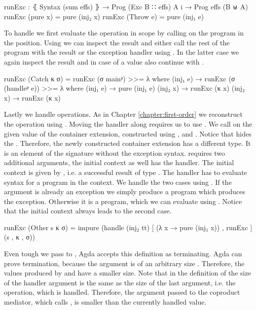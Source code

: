 \begin{code}
runExc : ⦃ Syntax (sum effs) ⦄ → Prog (Exc B ∷ effs) A {i} → Prog effs (B ⊎ A)
runExc (pure x)     = pure (inj₂ x)
runExc (Throw e)    = pure (inj₁ e)
\end{code}
To handle  we first evaluate the operation in
scope by calling  on the program in the
 position.
Using \AgdaFunction{>>=} we can inspect the result and either call the rest of
the program  with the result or the exception handler using
.
In the latter case we again inspect the result and in case of a value also
continue with .
\begin{code}
runExc (Catch κ σ)  = runExc (σ mainᵖ) >>= λ where
  (inj₁ e) → runExc (σ (handleᵖ e)) >>= λ where
    (inj₁ e) → pure (inj₁ e)
    (inj₂ x) → runExc (κ x)
  (inj₂ x) → runExc (κ x)
\end{code}
Lastly we handle  operations.
As in Chapter \ref{chapter:first-order} we reconstruct the operation using
.
Moving the handler along requires us to use .
We call  on the given value of the container extension,
constructed using ,  and .
Notice that  hides the
.
Therefore, the newly constructed container extension has a different type.
It is an element of the signature without the exception syntax.
 requires two additional arguments, the initial context as
well has the handler.
The initial context is given by
\AgdaSpace{}, i.e. a
successful result of type .
The handler has to evaluate  syntax for a program in the
context.
We handle the two cases using \AgdaFunction{[\_,\_]}.
If the argument is already an exception we simply produce a
 program which produces the exception.
Otherwise it is a program, which we can evaluate using .
Notice that the initial context always leads to the second case.
\begin{code}
runExc (Other s κ σ) = impure (handle (inj₂ tt) [ (λ x → pure (inj₁ x)) , runExc ] (s , κ , σ))
\end{code}
Even tough we pass  to , Agda accepts this
definition as terminating.
Agda can prove termination, because the argument is of an arbitrary size
.
Therefore, the values produced by  and  have a
smaller size.
Note that in the definition of  the size of the handler
argument is the same as the size of the last argument, i.e. the operation, which
is handled.
Therefore, the argument passed to the coproduct mediator, which calls
, is smaller than the currently handled value.

